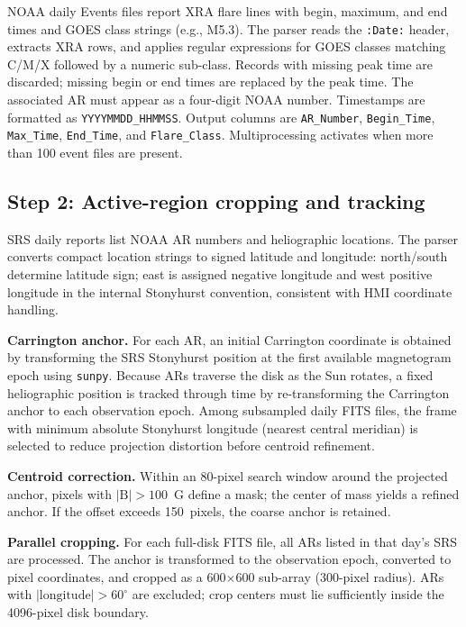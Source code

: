 \documentclass[]{spie}
\begin{document}
NOAA daily Events files report XRA flare lines with begin, maximum, and end times and GOES class strings (e.g., M5.3). The parser reads the \texttt{:Date:} header, extracts XRA rows, and applies regular expressions for GOES classes matching C/M/X followed by a numeric sub-class. Records with missing peak time are discarded; missing begin or end times are replaced by the peak time. The associated AR must appear as a four-digit NOAA number. Timestamps are formatted as \texttt{YYYYMMDD\_HHMMSS}. Output columns are \texttt{AR\_Number}, \texttt{Begin\_Time}, \texttt{Max\_Time}, \texttt{End\_Time}, and \texttt{Flare\_Class}. Multiprocessing activates when more than 100 event files are present.

\subsection{Step 2: Active-region cropping and tracking}

SRS daily reports list NOAA AR numbers and heliographic locations. The parser converts compact location strings to signed latitude and longitude: north/south determine latitude sign; east is assigned negative longitude and west positive longitude in the internal Stonyhurst convention, consistent with HMI coordinate handling.

\textbf{Carrington anchor.} For each AR, an initial Carrington coordinate is obtained by transforming the SRS Stonyhurst position at the first available magnetogram epoch using \texttt{sunpy}. Because ARs traverse the disk as the Sun rotates, a fixed heliographic position is tracked through time by re-transforming the Carrington anchor to each observation epoch. Among subsampled daily FITS files, the frame with minimum absolute Stonyhurst longitude (nearest central meridian) is selected to reduce projection distortion before centroid refinement.

\textbf{Centroid correction.} Within an 80-pixel search window around the projected anchor, pixels with $|\mathrm{B}| > 100$~G define a mask; the center of mass yields a refined anchor. If the offset exceeds 150~pixels, the coarse anchor is retained.

\textbf{Parallel cropping.} For each full-disk FITS file, all ARs listed in that day's SRS are processed. The anchor is transformed to the observation epoch, converted to pixel coordinates, and cropped as a 600$\times$600 sub-array (300-pixel radius). ARs with $|\mathrm{longitude}| > 60^\circ$ are excluded; crop centers must lie sufficiently inside the 4096-pixel disk boundary.
\end{document}
